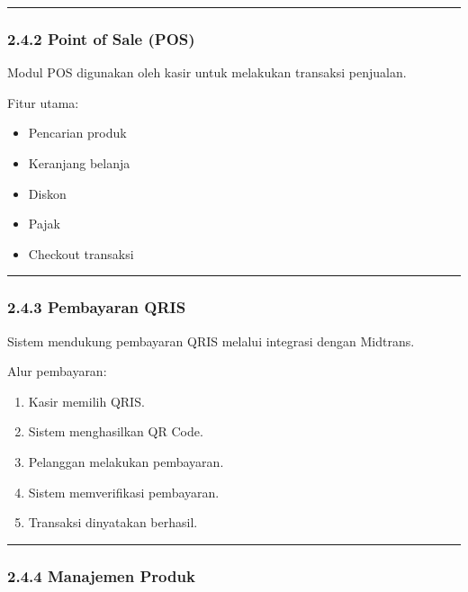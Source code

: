 \begin{center}\rule{0.5\linewidth}{0.5pt}\end{center}

\subsubsection{2.4.2 Point of Sale (POS)}\label{point-of-sale-pos}

Modul POS digunakan oleh kasir untuk melakukan transaksi penjualan.

Fitur utama:

\begin{itemize}
\tightlist
\item
  Pencarian produk
\item
  Keranjang belanja
\item
  Diskon
\item
  Pajak
\item
  Checkout transaksi
\end{itemize}

\begin{center}\rule{0.5\linewidth}{0.5pt}\end{center}

\subsubsection{2.4.3 Pembayaran QRIS}\label{pembayaran-qris}

Sistem mendukung pembayaran QRIS melalui integrasi dengan Midtrans.

Alur pembayaran:

\begin{enumerate}
\def\labelenumi{\arabic{enumi}.}
\tightlist
\item
  Kasir memilih QRIS.
\item
  Sistem menghasilkan QR Code.
\item
  Pelanggan melakukan pembayaran.
\item
  Sistem memverifikasi pembayaran.
\item
  Transaksi dinyatakan berhasil.
\end{enumerate}

\begin{center}\rule{0.5\linewidth}{0.5pt}\end{center}

\subsubsection{2.4.4 Manajemen Produk}\label{manajemen-produk}

